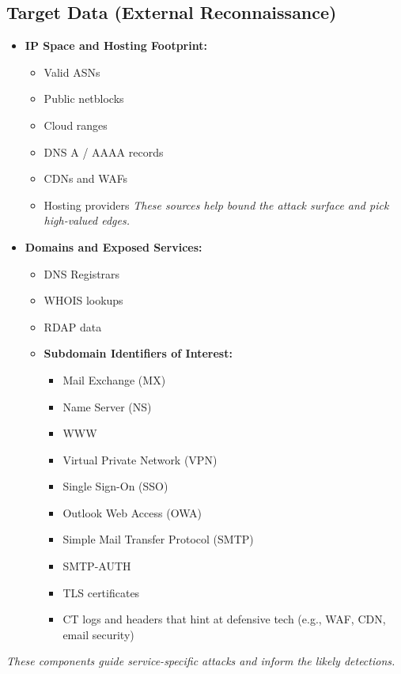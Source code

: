 \subsection{Target Data (External Reconnaissance)}
\begin{itemize}
    \item \textbf{IP Space and Hosting Footprint:}
    \begin{itemize}
        \item Valid ASNs
        \item Public netblocks
        \item Cloud ranges
        \item DNS A / AAAA records
        \item CDNs and WAFs
        \item Hosting providers
\textit{These sources help bound the attack surface and pick high-valued edges.
}    \end{itemize}
\item \textbf{Domains and Exposed Services:}
\begin{itemize}
    \item DNS Registrars
    \item WHOIS lookups
    \item RDAP data
    \item \textbf{Subdomain Identifiers of Interest:}
    \begin{itemize}
        \item Mail Exchange (MX)
        \item Name Server (NS)
        \item WWW
        \item Virtual Private Network (VPN)
        \item Single Sign-On (SSO)
        \item Outlook Web Access (OWA)
        \item Simple Mail Transfer Protocol (SMTP)
        \item SMTP-AUTH
        \item TLS certificates
        \item CT logs and headers that hint at defensive tech (e.g., WAF, CDN, email security)
    \end{itemize}
\end{itemize}
\end{itemize}
\textit{These components guide service-specific attacks and inform the likely detections.}
